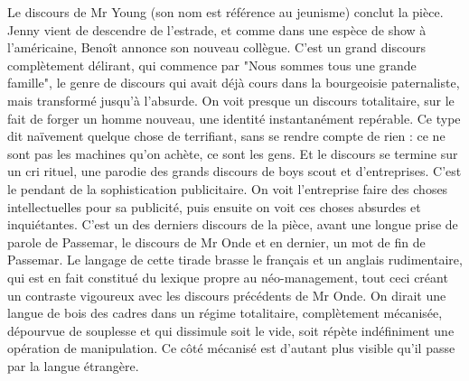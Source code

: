 \documentclass[a4paper,12pt]{book}
\begin{document}
\par Le discours de Mr Young (son nom est référence au jeunisme) conclut la pièce. Jenny vient de descendre de l'estrade, et comme dans une espèce de show à l'américaine, Benoît annonce son nouveau collègue. C'est un grand discours complètement délirant, qui commence par "Nous sommes tous une grande famille", le genre de discours qui avait déjà cours dans la bourgeoisie paternaliste, mais transformé jusqu'à l'absurde. On voit presque un discours totalitaire, sur le fait de forger un homme nouveau, une identité instantanément repérable. Ce type dit naïvement quelque chose de terrifiant, sans se rendre compte de rien : ce ne sont pas les machines qu'on achète, ce sont les gens. Et le discours se termine sur un cri rituel, une parodie des grands discours de boys scout et d'entreprises. C'est le pendant de la sophistication publicitaire. On voit l'entreprise faire des choses intellectuelles pour sa publicité, puis ensuite on voit ces choses absurdes et inquiétantes. C'est un des derniers discours de la pièce, avant une longue prise de parole de Passemar, le discours de Mr Onde et en dernier, un mot de fin de Passemar. Le langage de cette tirade brasse le français et un anglais rudimentaire, qui est en fait constitué du lexique propre au néo-management, tout ceci créant un contraste vigoureux avec les discours précédents de Mr Onde. On dirait une langue de bois des cadres dans un régime totalitaire, complètement mécanisée, dépourvue de souplesse et qui dissimule soit le vide, soit répète indéfiniment une opération de manipulation. Ce côté mécanisé est d'autant plus visible qu'il passe par la langue étrangère.
\end{document}
